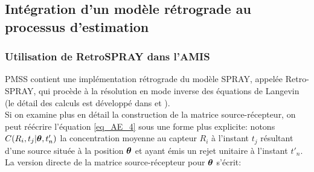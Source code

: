\subsection{Intégration d'un modèle {rétrograde} au processus d'estimation}

\subsubsection{Utilisation de RetroSPRAY dans l'AMIS}

 {PMSS contient une implémentation rétrograde du modèle SPRAY, appelée Retro-SPRAY, qui procède à la résolution en mode inverse des équations de Langevin (le détail des calculs est développé dans \cite{Flesch1995} et \cite{Wilson2009}).} \\
%
%
%
%

Si on examine plus en détail la construction de la matrice source-récepteur, on peut réécrire l'équation \eqref{eq_AE_4} sous une forme plus explicite: notons $C(R_i,t_j |{\bm{\theta}}, t'_n)$ la concentration moyenne au capteur $R_i$ à l'instant $t_j$ résultant d'une source située à la position ${\bm{\theta}}$ et ayant émis un rejet unitaire à l'instant $t'_n$. La version directe  de la matrice source-récepteur pour ${\bm{\theta}}$ s'écrit:

